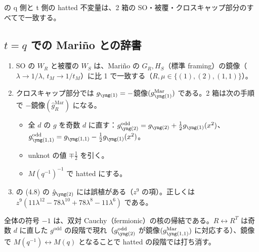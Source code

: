 \cite{KN17} の q 側と t 側の hatted 不変量は、2 箱の SO・被覆・クロスキャップ部分のすべてで一致する。

\subsection{$t = q$ での Mariño との辞書}
\begin{compresult}\label{cr:marino}
\begin{enumerate}
\item SO の $W_R$ と被覆の $W_S$ は、Mariño の $G_R, H_S$（標準 framing）の鏡像（$\lambda \to 1/\lambda$, $t_M \to 1/t_M$）に比 1 で一致する（$R, \mu \in \{(1), (2), (1,1)\}$）。
\item クロスキャップ部分では $g_{\yone} = -$鏡像$(g^{\mathrm{Mar}}_{\yone})$ である。2 箱は次の手順で $-$鏡像$(\hat g^{\mathrm{Mar}}_R)$ になる。
  \begin{itemize}
  \item 全 $d$ の $g$ を奇数 $d$ に直す：$g^{\mathrm{odd}}_{\ytwo} = g_{\ytwo} + \tfrac12 g_{\yone}(x^2)$、$g^{\mathrm{odd}}_{\yoneone} = g_{\yoneone} - \tfrac12 g_{\yone}(x^2)$。
  \item unknot の値 $\mp\tfrac12$ を引く。
  \item $M(q^{-1})^{-1}$ で hatted にする。
  \end{itemize}
\item \cite{Marino09} の (4.8) の $\hat g_{\ytwo}$ には誤植がある（$z^9$ の項）。正しくは $z^9(11\lambda^{12} - 78\lambda^{10} + 78\lambda^8 - 11\lambda^6)$ である。
\end{enumerate}
\end{compresult}
全体の符号 $-1$ は、双対 Cauchy（fermionic）の核の帰結である。$R \leftrightarrow R^T$ は奇数 $d$ に直した $g^{\mathrm{odd}}$ の段階で現れ（$g^{\mathrm{odd}}_{\ytwo}$ が鏡像$(g^{\mathrm{Mar}}_{\yoneone})$ に対応する）、鏡像で $M(q^{-1}) \leftrightarrow M(q)$ となることで hatted の段階では打ち消す。

